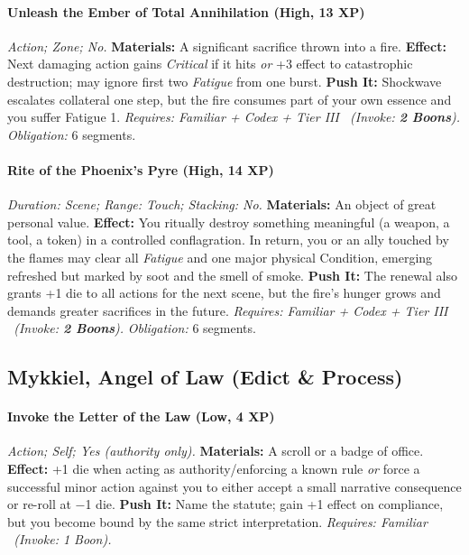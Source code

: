 \documentclass[12pt,twoside]{book}
\begin{document}
\paragraph{Unleash the Ember of Total Annihilation (High, 13 XP)} \emph{Action; Zone; No.}
\textbf{Materials:} A significant sacrifice thrown into a fire.
\textbf{Effect:} Next damaging action gains \emph{Critical} if it hits \emph{or} +3 effect to catastrophic destruction; may ignore first two \emph{Fatigue} from one burst.
\textbf{Push It:} Shockwave escalates collateral one step, but the fire consumes part of your own essence and you suffer Fatigue 1.
\emph{Requires: Familiar + Codex + Tier III \ (\textit{Invoke:} \textbf{2 Boons}).}
\emph{Obligation:} 6 segments.

\paragraph{Rite of the Phoenix's Pyre (High, 14 XP)} \emph{Duration: Scene; Range: Touch; Stacking: No.}
\textbf{Materials:} An object of great personal value.
\textbf{Effect:} You ritually destroy something meaningful (a weapon, a tool, a token) in a controlled conflagration. In return, you or an ally touched by the flames may clear all \emph{Fatigue} and one major physical Condition, emerging refreshed but marked by soot and the smell of smoke.
\textbf{Push It:} The renewal also grants +1 die to all actions for the next scene, but the fire's hunger grows and demands greater sacrifices in the future.
\emph{Requires: Familiar + Codex + Tier III \ (\textit{Invoke:} \textbf{2 Boons}).}
\emph{Obligation:} 6 segments.

\subsection{Mykkiel, Angel of Law (Edict \& Process)}
\paragraph{Invoke the Letter of the Law (Low, 4 XP)} \emph{Action; Self; Yes (authority only).}
\textbf{Materials:} A scroll or a badge of office.
\textbf{Effect:} +1 die when acting as authority/enforcing a known rule \emph{or} force a successful minor action against you to either accept a small narrative consequence or re-roll at −1 die.
\textbf{Push It:} Name the statute; gain +1 effect on compliance, but you become bound by the same strict interpretation.
\emph{Requires: Familiar \ (\textit{Invoke:} 1 Boon).}
\end{document}
